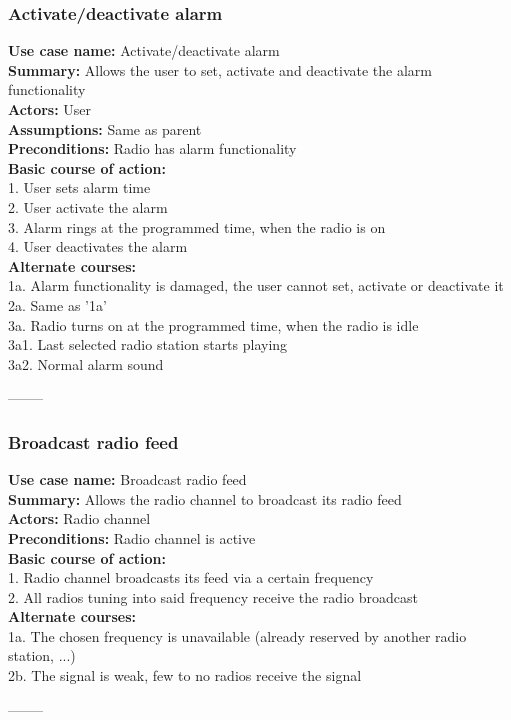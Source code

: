 \documentclass[11pt]{article}
\begin{document}
\subsubsection{Activate/deactivate alarm}
\textbf{Use case name:} Activate/deactivate alarm\\
\textbf{Summary:} Allows the user to set, activate and deactivate the alarm functionality\\
\textbf{Actors:} User\\
\textbf{Assumptions:} Same as parent\\
\textbf{Preconditions:} Radio has alarm functionality\\
\textbf{Basic course of action:}\\
1. User sets alarm time\\
2. User activate the alarm\\
3. Alarm rings at the programmed time, when the radio is on\\
4. User deactivates the alarm\\
\textbf{Alternate courses:}\\
1a. Alarm functionality is damaged, the user cannot set, activate or deactivate it\\
2a. Same as '1a'\\
3a. Radio turns on at the programmed time, when the radio is idle\\
\hspace*{10mm}3a1. Last selected radio station starts playing\\
\hspace*{10mm}3a2. Normal alarm sound
\begin{center}--------\end{center}

\subsubsection{Broadcast radio feed}
\textbf{Use case name:} Broadcast radio feed\\
\textbf{Summary:} Allows the radio channel to broadcast its radio feed\\
\textbf{Actors:} Radio channel\\
\textbf{Preconditions:} Radio channel is active\\
\textbf{Basic course of action:}\\
1. Radio channel broadcasts its feed via a certain frequency\\
2. All radios tuning into said frequency receive the radio broadcast\\
\textbf{Alternate courses:}\\
1a. The chosen frequency is unavailable (already reserved by another radio station, ...)\\
2b. The signal is weak, few to no radios receive the signal
\begin{center}--------\end{center}
\end{document}
